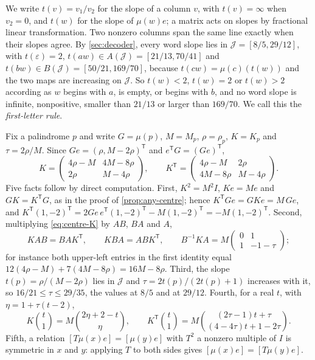 We write $t(v)=v_1/v_2$ for the slope of a column $v$, with $t(v)=\infty$ when $v_2=0$, and $t(w)$
for the slope of $\mu(w)e$; a matrix acts on slopes by fractional linear transformation. Two
nonzero columns span the same line exactly when their slopes agree. By \cref{sec:decoder}, every
word slope lies in $\mathcal J=[8/5,29/12]$, with $t(\varepsilon)=2$, $t(aw)\in A(\mathcal J)=[21/13,70/41]$
and $t(bw)\in B(\mathcal J)=[50/21,169/70]$, because $t(cw)=\mu(c)(t(w))$ and the two maps are
increasing on $\mathcal J$. So $t(w)<2$, $t(w)=2$ or $t(w)>2$ according as $w$ begins with $a$, is
empty, or begins with $b$, and no word slope is infinite, nonpositive, smaller than $21/13$ or
larger than $169/70$. We call this the \emph{first-letter rule}.

Fix a palindrome $p$ and write $G=\mu(p)$, $M=M_p$, $\rho=\rho_p$, $K=K_p$ and $\tau=2\rho/M$.
Since $Ge=(\rho,M-2\rho)^{\mathsf T}$ and $e^{\mathsf T}G=(Ge)^{\mathsf T}$,
\begin{equation}\label{eq:centre-K}
 K=\begin{pmatrix}4\rho-M&4M-8\rho\\2\rho&M-4\rho\end{pmatrix},\qquad
 K^{\mathsf T}=\begin{pmatrix}4\rho-M&2\rho\\4M-8\rho&M-4\rho\end{pmatrix}.
\end{equation}
Five facts follow by direct computation. First, $K^2=M^2I$, $Ke=Me$ and $GK=K^{\mathsf T}G$, as in
the proof of \cref{prop:any-centre}; hence $K^{\mathsf T}Ge=GKe=M\,Ge$, and
$K^{\mathsf T}(1,-2)^{\mathsf T}=2Ge\,e^{\mathsf T}(1,-2)^{\mathsf T}-M(1,-2)^{\mathsf T}=-M(1,-2)^{\mathsf T}$.
Second, multiplying \eqref{eq:centre-K} by $AB$, $BA$ and $A$,
\begin{equation}\label{eq:centre-intertwining}
 KAB=BAK^{\mathsf T},\qquad KBA=ABK^{\mathsf T},\qquad
 B^{-1}KA=M\begin{pmatrix}0&1\\1&-1-\tau\end{pmatrix};
\end{equation}
for instance both upper-left entries in the first identity equal $12(4\rho-M)+7(4M-8\rho)=16M-8\rho$.
Third, the slope $t(p)=\rho/(M-2\rho)$ lies in $\mathcal J$ and $\tau=2t(p)/(2t(p)+1)$ increases
with it, so $16/21\leqslant\tau\leqslant29/35$, the values at $8/5$ and at $29/12$. Fourth, for a
real $t$, with $\eta=1+\tau(t-2)$,
\begin{equation}\label{eq:centre-slopes}
 K\binom t1=M\binom{2\eta+2-t}{\eta},\qquad
 K^{\mathsf T}\binom t1=M\binom{(2\tau-1)t+\tau}{(4-4\tau)t+1-2\tau}.
\end{equation}
Fifth, a relation $[T\mu(x)e]=[\mu(y)e]$ with $T^2$ a nonzero multiple of $I$ is symmetric in $x$
and $y$: applying $T$ to both sides gives $[\mu(x)e]=[T\mu(y)e]$.

